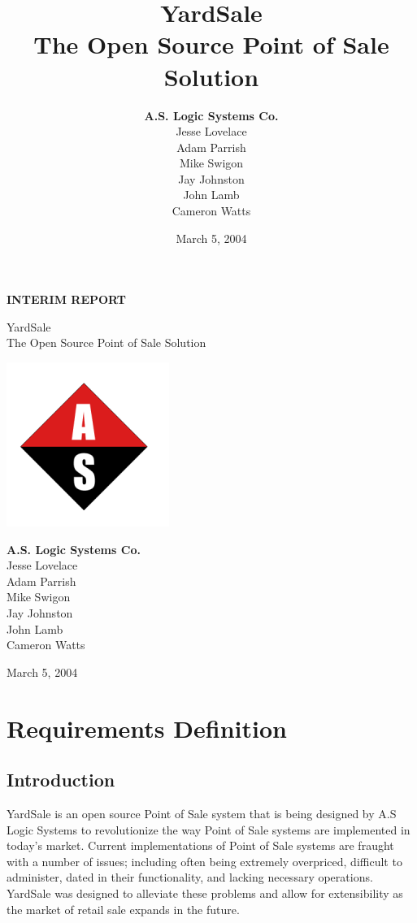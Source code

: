 \documentclass{report}
\title{YardSale\\The Open Source Point of Sale Solution}
\author{{\bf A.S. Logic Systems Co.}\\Jesse Lovelace\\Adam Parrish\\Mike Swigon\\Jay Johnston\\John Lamb\\Cameron Watts}
\date{March 5, 2004}
\begin{document}
\begin{titlepage}
\vspace*{2cm}
\begin{center}

{\LARGE {\bf INTERIM REPORT}}\\
\vspace*{1cm}



\LARGE{ YardSale\\The Open Source Point of Sale Solution\\ }


\includegraphics{aslogic_smaller.png}

\large{{\bf A.S. Logic Systems Co.}\\Jesse Lovelace\\Adam
Parrish\\Mike Swigon\\Jay Johnston\\John Lamb\\Cameron Watts\\}

\vspace*{0.5cm}

{March 5, 2004}
\end{center}
\end{titlepage}

\tableofcontents

\chapter{Requirements Definition}

\section{Introduction}

YardSale is an open source Point of Sale system that is being
designed by A.S Logic Systems to revolutionize the way Point of
Sale systems are implemented in today's market.  Current
implementations of Point of Sale systems are fraught with a number
of issues; including often being extremely overpriced, difficult
to administer, dated in their functionality, and lacking necessary
operations.  YardSale was designed to alleviate these problems and
allow for extensibility as the market of retail sale expands in
the future.
\end{document}
